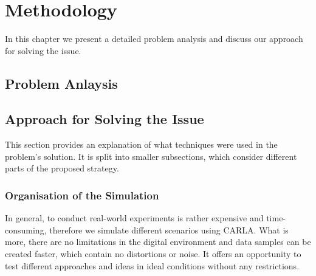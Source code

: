 \chapter{Methodology}
In this chapter we present a detailed problem analysis and discuss our approach for solving the issue.
\label{mainone}
\section{Problem Anlaysis}



\section{Approach for Solving the Issue}
This section provides an explanation of what techniques were used in the problem's solution. It is split into smaller subsections, which consider different parts of the proposed strategy.

\subsection{Organisation of the Simulation}
In general, to conduct real-world experiments is rather expensive and time-consuming, therefore we simulate different scenarios using CARLA. What is more, there are no limitations in the digital environment and data samples can be created faster, which contain no distortions or noise. It offers an opportunity to test different approaches and ideas in ideal conditions without any restrictions.

